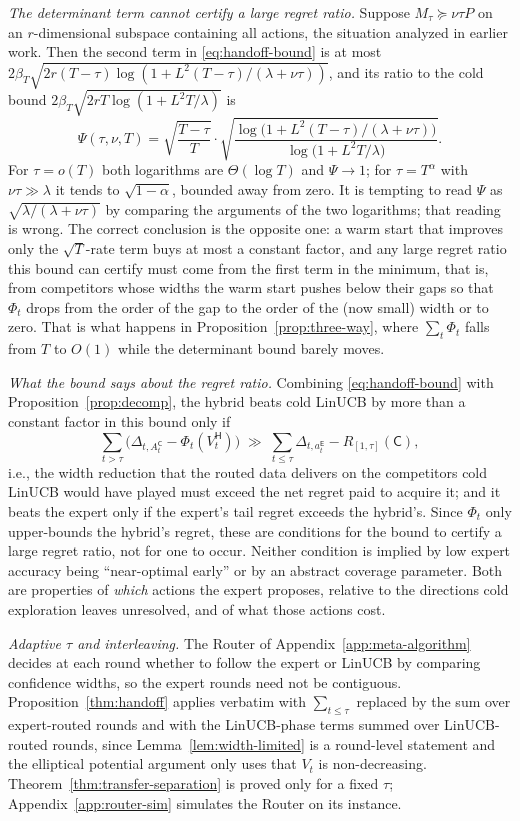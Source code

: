 \documentclass[anon]{alt2027} %
\newcommand{\Cold}{\mathsf{C}}
\newcommand{\Exp}{\mathsf{E}}
\newcommand{\Hyb}{\mathsf{H}}
\begin{document}
\emph{The determinant term cannot certify a large regret ratio.} Suppose
$M_\tau\succeq\nu\tau P$ on an $r$-dimensional subspace containing all actions,
the situation analyzed in earlier work. Then the second term in
\eqref{eq:handoff-bound} is at most
$2\beta_T\sqrt{2r(T-\tau)\log(1+L^2(T-\tau)/(\lambda+\nu\tau))}$, and its ratio
to the cold bound $2\beta_T\sqrt{2rT\log(1+L^2T/\lambda)}$ is
\[
\Psi(\tau,\nu,T)=\sqrt{\frac{T-\tau}{T}}\cdot\sqrt{\frac{\log\bigl(1+L^2(T-\tau)/(\lambda+\nu\tau)\bigr)}{\log\bigl(1+L^2T/\lambda\bigr)}}.
\]
For $\tau=o(T)$ both logarithms are $\Theta(\log T)$ and $\Psi\to1$; for
$\tau=T^{\alpha}$ with $\nu\tau\gg\lambda$ it tends to $\sqrt{1-\alpha}$, bounded
away from zero. It is tempting to read $\Psi$ as
$\sqrt{\lambda/(\lambda+\nu\tau)}$ by comparing the arguments of the two
logarithms; that reading is wrong. The correct conclusion is the opposite
one: a warm start that improves only the $\sqrt{T}$-rate term buys at most a
constant factor, and any large regret ratio this bound can certify must come from the first term in the
minimum, that is, from competitors whose widths the warm start pushes below
their gaps so that $\Phi_t$ drops from the order of the gap to the order of
the (now small) width or to zero. That is what happens in
Proposition~\ref{prop:three-way}, where $\sum_t\Phi_t$ falls from $T$ to $O(1)$
while the determinant bound barely moves.

\emph{What the bound says about the regret ratio.} Combining
\eqref{eq:handoff-bound} with Proposition~\ref{prop:decomp}, the hybrid beats
cold LinUCB by more than a constant factor in this bound only if
\[
\sum_{t>\tau}\bigl(\Delta_{t,A^{\Cold}_t}-\Phi_t(V^{\Hyb}_t)\bigr)
\;\gg\;
\sum_{t\le\tau}\Delta_{t,a_t^{\Exp}}-R_{[1,\tau]}(\Cold),
\]
i.e., the width reduction that the routed data delivers on the competitors
cold LinUCB would have played must exceed the net regret paid to acquire it;
and it beats the expert only if the expert's tail regret exceeds the hybrid's.
Since $\Phi_t$ only upper-bounds the hybrid's regret, these are conditions for
the bound to certify a large regret ratio, not for one to occur.
Neither condition is implied by low expert accuracy being ``near-optimal
early'' or by an abstract coverage parameter. Both are properties of
\emph{which} actions the expert proposes, relative to the directions cold
exploration leaves unresolved, and of what those actions cost.

\emph{Adaptive $\tau$ and interleaving.} The Router of
Appendix~\ref{app:meta-algorithm} decides at each round whether to follow the
expert or LinUCB by comparing confidence widths, so the expert rounds need not
be contiguous. Proposition~\ref{thm:handoff} applies verbatim with
$\sum_{t\le\tau}$ replaced by the sum over expert-routed rounds and with the
LinUCB-phase terms summed over LinUCB-routed rounds, since
Lemma~\ref{lem:width-limited} is a round-level statement and the elliptical
potential argument only uses that $V_t$ is non-decreasing.
Theorem~\ref{thm:transfer-separation} is proved only for a fixed $\tau$;
Appendix~\ref{app:router-sim} simulates the Router on its instance.
\end{document}
